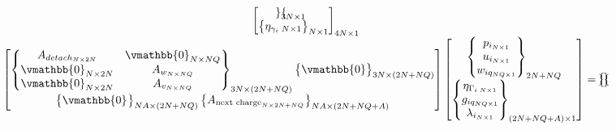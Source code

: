 \documentclass[letterpaper, 10pt, conference]{IEEEtran}
\begin{document}
\begin{equation}
\begin{array}{c}
\begin{bmatrix}
\begin{Bmatrix}
    \end{Bmatrix}_{3N \times 1} \\
    \begin{Bmatrix}
        \eta_{\gamma_{i}\; N \times 1} \\
    \end{Bmatrix}_{N \times 1}
\end{bmatrix}_{4N \times 1} \\
\begin{bmatrix}
    \begin{Bmatrix}
        A_{detach_{N \times 2N}}    & \vmathbb{0}_{N \times NQ} \\
        \vmathbb{0}_{N \times 2N} & A_{w_{N \times NQ}}          \\
        \vmathbb{0}_{N \times 2N} & A_{v_{N \times NQ}}          \\
    \end{Bmatrix}_{3N \times (2N + NQ)}
    \begin{Bmatrix}
        \vmathbb{0}
    \end{Bmatrix}_{3N \times (2N + NQ)} \\
    \begin{Bmatrix}
        \vmathbb{0}_{}
    \end{Bmatrix}_{NA \times (2N + NQ)}
    \begin{Bmatrix}
        A_{\textrm{next charge}_{N \times 2N + NQ}}
    \end{Bmatrix}_{NA \times (2N + NQ + A)} \\
\end{bmatrix}
\begin{bmatrix}
    \begin{Bmatrix}
        p_{i_{N \times 1}} \\
        u_{i_{N \times 1}} \\
        w_{iq_{NQ \times 1}} \\
    \end{Bmatrix}_{2N + NQ} \\
    \begin{Bmatrix}
        \eta_{\Gamma_{i\; N \times 1}} \\
        g_{iq_{NQ \times 1}}           \\
        \lambda_{i_{N \times 1}}       \\
    \end{Bmatrix}_{(2N + NQ + A) \times 1}
\end{bmatrix}
=
\begin{bmatrix}
    \begin{Bmatrix}

\end{Bmatrix}
\end{bmatrix}
\end{array}
\end{equation}
\end{document}
